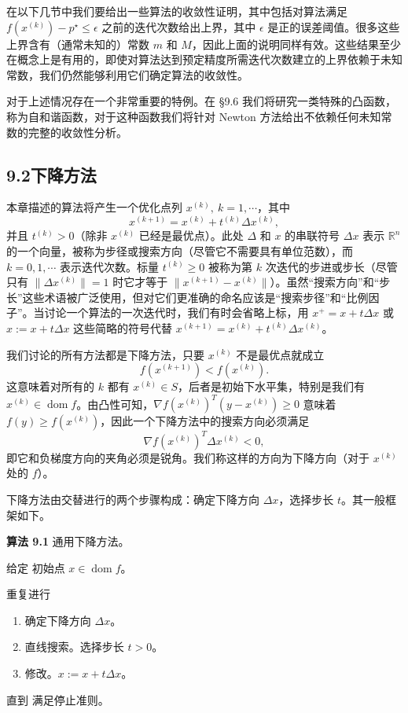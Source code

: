 \documentclass[UTF8,12pt,a4paper,fontset=fandol]{ctexart}
\begin{document}
在以下几节中我们要给出一些算法的收敛性证明，其中包括对算法满足 $f(x^{(k)})-p^\star\leq\epsilon$ 之前的迭代次数给出上界，其中 $\epsilon$ 是正的误差阈值。很多这些上界含有（通常未知的）常数 $m$ 和 $M$，因此上面的说明同样有效。这些结果至少在概念上是有用的，即使对算法达到预定精度所需迭代次数建立的上界依赖于未知常数，我们仍然能够利用它们确定算法的收敛性。

对于上述情况存在一个非常重要的特例。在 \S9.6 我们将研究一类特殊的凸函数，称为自和谐函数，对于这种函数我们将针对 Newton 方法给出不依赖任何未知常数的完整的收敛性分析。

\subsection*{9.2\quad 下降方法}

本章描述的算法将产生一个优化点列 $x^{(k)},\ k=1,\cdots$，其中
\[
x^{(k+1)}=x^{(k)}+t^{(k)}\Delta x^{(k)},
\]
并且 $t^{(k)}>0$（除非 $x^{(k)}$ 已经是最优点）。此处 $\Delta$ 和 $x$ 的串联符号 $\Delta x$ 表示 $\mathbb{R}^n$ 的一个向量，被称为步径或搜索方向（尽管它不需要具有单位范数），而 $k=0,1,\cdots$ 表示迭代次数。标量 $t^{(k)}\geq0$ 被称为第 $k$ 次迭代的步进或步长（尽管只有 $\|\Delta x^{(k)}\|=1$ 时它才等于 $\|x^{(k+1)}-x^{(k)}\|$）。虽然“搜索方向”和“步长”这些术语被广泛使用，但对它们更准确的命名应该是“搜索步径”和“比例因子”。当讨论一个算法的一次迭代时，我们有时会省略上标，用 $x^+=x+t\Delta x$ 或 $x:=x+t\Delta x$ 这些简略的符号代替 $x^{(k+1)}=x^{(k)}+t^{(k)}\Delta x^{(k)}$。

我们讨论的所有方法都是下降方法，只要 $x^{(k)}$ 不是最优点就成立
\[
f(x^{(k+1)})<f(x^{(k)}).
\]
这意味着对所有的 $k$ 都有 $x^{(k)}\in S$，后者是初始下水平集，特别是我们有 $x^{(k)}\in\operatorname{dom} f$。由凸性可知，$\nabla f(x^{(k)})^T(y-x^{(k)})\geq0$ 意味着 $f(y)\geq f(x^{(k)})$，因此一个下降方法中的搜索方向必须满足
\[
\nabla f(x^{(k)})^T\Delta x^{(k)}<0,
\]
即它和负梯度方向的夹角必须是锐角。我们称这样的方向为下降方向（对于 $x^{(k)}$ 处的 $f$）。

下降方法由交替进行的两个步骤构成：确定下降方向 $\Delta x$，选择步长 $t$。其一般框架如下。

\noindent\textbf{算法 9.1}\quad
通用下降方法。

给定 初始点 $x\in\operatorname{dom} f$。

重复进行
\begin{enumerate}
\item 确定下降方向 $\Delta x$。
\item 直线搜索。选择步长 $t>0$。
\item 修改。$x:=x+t\Delta x$。
\end{enumerate}
直到 满足停止准则。
\end{document}
